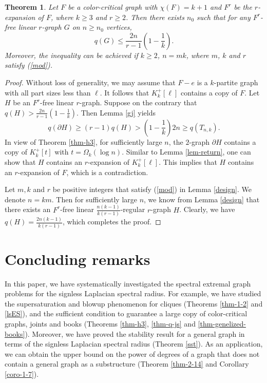 \documentclass[11pt,a4paper]{article}
\theoremstyle{plain}
\newtheorem{theorem}{Theorem}[section]
\theoremstyle{definition}
\begin{document}
\begin{theorem}\label{linear hypergraph}
Let $F$ be a color-critical graph with $\chi(F)=k+1$ and $F^{r}$ be the $r$-expansion of $F$, where $k\geq3$ and $r\geq2$. Then there exists $n_{0}$  such that for  any  $F^{r}$-free linear $r$-graph $G$ on $n\geq n_{0}$ vertices,
$$q(G)\leq \frac{2n}{r-1} \left( 1- \frac{1}{k}\right).$$
Moreover, the inequality can be achieved if $k\geq 2$, $n=mk$, where $m$, $k$ and $r$ satisfy (\ref{mod}).
\end{theorem}
 

\begin{proof}
Without loss of generality, we may assume that $F-e$ is a $k$-partite graph with all part sizes less than $\ell$.
 It follows that $K_{k}^{+}[\ell]$ contains a copy of $F$. Let $H$ be an $F^{r}$-free linear $r$-graph. 
 Suppose on the contrary that  $q(H)>\frac{2n}{r-1}(1- \frac{1}{k})$. Then Lemma  \ref{gj} yields 
$$q(\partial H)\geq(r-1)q(H)> \left(1- \frac{1}{k}\right)2n \geq q( T_{n,k}).$$
In view of Theorem \ref{thm-h3}, for sufficiently large $n$, the $2$-graph $\partial H$ contains a copy of $K_{k}^{+}[t]$ with $t=\Omega_k(\log n)$.
Similar to Lemma \ref{lem-return}, one can show that  $H$ contains an $r$-expansion of $K_{k}^{+}[\ell]$. This implies that $H$ contains an $r$-expansion of $F$, which is a contradiction. 


Let $m,k$ and $r$ be positive integers that satisfy (\ref{mod}) in Lemma \ref{design}. We denote 
 $n=km$.  
Then for sufficiently large $n$,
 we know from Lemma \ref{design} that there exists an  $F^{r}$-free  linear $\frac{n(k-1)}{k(r-1)}$-regular $r$-graph $H$. Clearly, 
 we have $q(H)=\frac{2n(k-1)}{k(r-1)}$, which completes the proof.
\end{proof}




\section{Concluding remarks}

\label{sec-9}

In this paper, we have systematically investigated the spectral extremal graph problems for the signless Laplacian spectral radius. 
For example, we have studied the supersaturation and blowup phenomenon for cliques (Theorems \ref{thm-1-2} and \ref{lsES}), and the sufficient condition to guarantee a large copy of color-critical graphs, joints and books (Theorems \ref{thm-h3}, \ref{thm-q-js} and \ref{thm-genelized-books}). Moreover, we have proved the stability result for a general graph in terms of the signless Laplacian spectral radius (Theorem \ref{sst}). 
As an application, we can obtain the upper bound on the power of degrees of a graph that does not contain a general graph as a substructure (Theorem \ref{thm-2-14} 
and Corollary \ref{coro-1-7}). 
\end{document}
